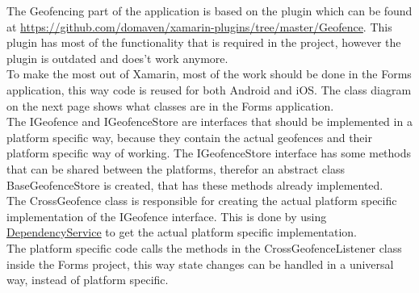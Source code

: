 The \gls{Geofencing} part of the application is based on the plugin which can be found at \url{https://github.com/domaven/xamarin-plugins/tree/master/Geofence}. This plugin has most of the functionality that is required in the project, however the plugin is outdated and does't work anymore. \\
To make the most out of Xamarin, most of the work should be done in the Forms application, this way code is reused for both Android and iOS. The class diagram on the next page shows what classes are in the Forms application. \\ 
The IGeofence and IGeofenceStore are interfaces that should be implemented in a platform specific way, because they contain the actual geofences and their platform specific way of working. The IGeofenceStore interface has some methods that can be shared between the platforms, therefor an abstract class BaseGeofenceStore is created, that has these methods already implemented.\\
The CrossGeofence class is responsible for creating the actual platform specific implementation of the IGeofence interface. This is done by using \href{https://developer.xamarin.com/guides/xamarin-forms/dependency-service/}{DependencyService} to get the actual platform specific implementation. \\
The platform specific code calls the methods in the CrossGeofenceListener class inside the Forms project, this way state changes can be handled in a universal way, instead of platform specific.

